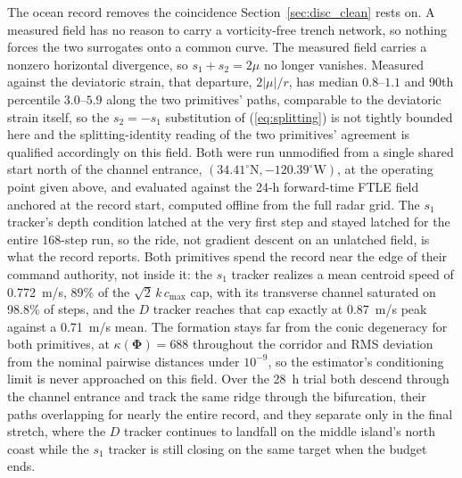 \documentclass[lettersize,journal]{IEEEtran}
\begin{document}
The ocean record removes the coincidence Section~\ref{sec:disc_clean} rests
on. A measured field has no reason to carry a vorticity-free trench
network, so nothing forces the two surrogates
onto a common curve. The measured field carries a nonzero horizontal
divergence, so $s_1 + s_2 = 2\mu$ no longer vanishes. Measured against
the deviatoric strain, that departure, $2|\mu|/r$, has median
$0.8$--$1.1$ and 90th percentile $3.0$--$5.9$ along the two primitives'
paths, comparable to the deviatoric strain itself, so the
$s_2 = -s_1$ substitution of (\ref{eq:splitting}) is not tightly
bounded here and the
splitting-identity reading of the two primitives' agreement is qualified
accordingly on this field. Both were run unmodified from a single shared
start north of the channel entrance,
$(34.41^{\circ}\mathrm{N}, -120.39^{\circ}\mathrm{W})$, at the operating
point given above, and evaluated against the 24-h forward-time FTLE
field anchored at the record start, computed offline from the full radar
grid. The $s_1$ tracker's depth condition
latched at the very first step and stayed latched for the entire
168-step run, so the ride, not gradient descent on an unlatched field, is
what the record reports. Both primitives spend the record near the edge
of their command authority, not inside it: the $s_1$ tracker
realizes a mean centroid speed of 0.772~m/s, 89\% of the
$\sqrt{2}\,k\,c_{\max}$ cap, with its transverse channel saturated on
98.8\% of steps, and the $D$ tracker reaches that cap exactly at
0.87~m/s peak against a 0.71~m/s mean. The formation
stays far from the conic degeneracy for both
primitives, at $\kappa(\boldsymbol{\Phi}) = 688$ throughout the corridor
and RMS deviation from the nominal pairwise distances under $10^{-9}$,
so the estimator's conditioning limit is never
approached on this field.
Over the 28~h trial both descend through
the channel entrance and track the same ridge through the bifurcation,
their paths overlapping for nearly the entire record, and they separate
only in the final stretch, where the $D$ tracker continues to landfall on
the middle island's north coast while the $s_1$ tracker is still closing on
the same target when the budget ends.
\end{document}
